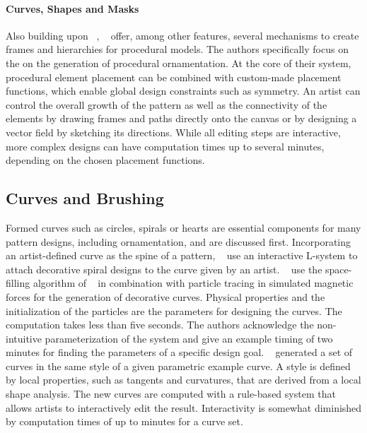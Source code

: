 {\paragraph*{Curves, Shapes and Masks} Also building upon \citeauthor*{wong_1998_cgf}~\cite{wong_1998_cgf}, \citeauthor*{gieseke_2017_ooo}~\cite{gieseke_2017_ooo} offer, among other features, several mechanisms to create frames and hierarchies for procedural models. The authors specifically focus on the on the generation of procedural ornamentation. At the core of their system, procedural element placement can be combined with custom-made placement functions, which enable global design constraints such as symmetry. An artist can control the overall growth of the pattern as well as the connectivity of the elements by drawing frames and paths directly onto the canvas or by designing a vector field by sketching its directions. While all editing steps are interactive, more complex designs can have computation times up to several minutes, depending on the chosen placement functions.}


\subsection{Curves and Brushing}
\label{subsec:analysis_curves}


Formed curves such as circles, spirals or hearts are essential components for many pattern designs, including ornamentation, and are discussed first. Incorporating an artist-defined curve as the spine of a pattern, \citeauthor*{yu_2012_ans}~\cite{yu_2012_ans} use an interactive L-system to attach decorative spiral designs to the curve given by an artist. \citeauthor*{xu_2009_mcc}~\cite{xu_2009_mcc} use the space-filling algorithm of \citeauthor*{wong_1998_cgf}~\cite{wong_1998_cgf} in combination with particle tracing in simulated magnetic forces for the generation of decorative curves. Physical properties and the initialization of the particles are the parameters for designing the curves. The computation takes less than five seconds. The authors acknowledge the non-intuitive parameterization of the system and give an example timing of two minutes for finding the parameters of a specific design goal. \citeauthor*{merrell_2010_ecs}~\cite{merrell_2010_ecs} generated a set of curves in the same style of a given parametric example curve. A style is defined by local properties, such as tangents and curvatures, that are derived from a local shape analysis. The new curves are computed with a rule-based system that allows artists to interactively edit the result. Interactivity is somewhat diminished by computation times of up to minutes for a curve set. 

